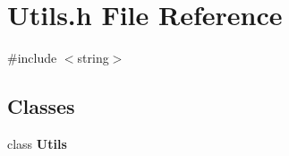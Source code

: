 \section{Utils.\+h File Reference}
\label{Utils_8h}
{\ttfamily \#include $<$string$>$}\newline
\subsection*{Classes}
\begin{DoxyCompactItemize}
\item 
class \textbf{ Utils}
\end{DoxyCompactItemize}
